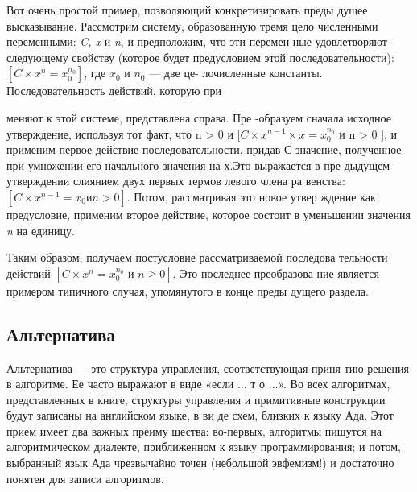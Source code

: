 \parindent=1cm Вот очень простой пример, позволяющий конкретизировать преды­
дущее  высказывание.  Рассмотрим систему,  образованную тремя цело­
численными переменными: \textit{C, x} и \textit{n}, и предположим, что эти перемен­
ные удовлетворяют следующему свойству (которое будет предусловием 
этой последовательности):\textit{$[C\times x^{n} = x_{0}^{n_{0}}]$}, где \textit{$x_{0}$} и \textit{$n_{0}$} --- две це-
лочисленные константы. Последовательность действий, которую при­
меняют к этой системе, представлена справа. Пре­\linebreak
-образуем сначала исходное утверждение, используя тот 
факт, что 
\noindent n > 0 и \textit{$[C\times x^{n-1} \times x = x_{0}^{n_{0}}$} и n > 0 ], и применим
первое  действие  последовательности, придав С значение, полученное 
при умножении его начального значения на х.Это выражается в пре­
дыдущем утверждении слиянием двух первых термов левого члена ра­
венства:\textit{$[C\times x^{n-1} = x_{0} и n > 0]$}. Потом, рассматривая это новое утвер­
ждение как  предусловие,  применим  второе действие, которое состоит 
в уменьшении значения \textit{n} на единицу.

\parindent=1cm Таким образом, получаем постусловие  рассматриваемой последова­
тельности действий \textit{$[C\times x^{n} = x_{0}^{n_{0}} \textit{ и } n \geqslant 0]$}. Это последнее преобразова­
ние является примером типичного случая, упомянутого в конце преды­
дущего раздела.

\subsection{Альтернатива}
\noindent Альтернатива — это структура управления,  соответствующая  приня­
тию решения в алгоритме. Ее часто выражают в виде «если ...  т о  ...». 
Во всех алгоритмах, представленных в книге, структуры управления и 
примитивные конструкции будут записаны на английском языке, в ви­
де схем, близких к языку Ада.  Этот прием имеет два важных преиму­
щества: во-первых, алгоритмы пишутся на алгоритмическом диалекте, 
приближенном к языку  программирования; и потом,  выбранный язык 
Ада чрезвычайно точен  (небольшой эвфемизм!)  и достаточно понятен 
для записи алгоритмов.


